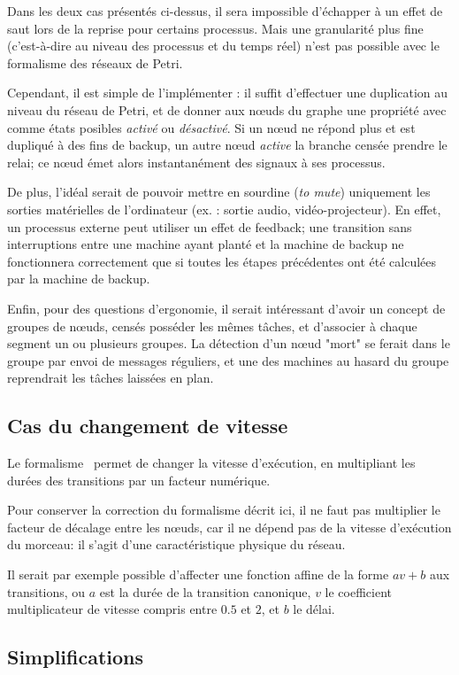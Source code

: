 Dans les deux cas présentés ci-dessus, il sera impossible d'échapper à un effet de saut lors de la reprise pour certains processus. Mais une granularité plus fine (c'est-à-dire au niveau des processus et du temps réel) n'est pas possible avec le formalisme des réseaux de Petri.

Cependant, il est simple de l'implémenter : il suffit d'effectuer une duplication au niveau du réseau de Petri, et de donner aux nœuds du graphe une propriété avec comme états posibles \textit{activé} ou \textit{désactivé}. Si un nœud ne répond plus et est dupliqué à des fins de backup, un autre nœud \textit{active} la branche censée prendre le relai; ce nœud émet alors instantanément des signaux à ses processus.

De plus, l'idéal serait de pouvoir mettre en sourdine (\textit{to mute}) uniquement les sorties matérielles de l'ordinateur (ex. : sortie audio, vidéo-projecteur). En effet, un processus externe peut utiliser un effet de feedback; une transition sans interruptions entre une machine ayant planté et la machine de backup ne fonctionnera correctement que si toutes les étapes précédentes ont été calculées par la machine de backup.

Enfin, pour des questions d'ergonomie, il serait intéressant d'avoir un concept de groupes de nœuds, censés posséder les mêmes tâches, et d'associer à chaque segment un ou plusieurs groupes. La détection d'un nœud "mort" se ferait dans le groupe par envoi de messages réguliers, et une des machines au hasard du groupe reprendrait les tâches laissées en plan.

\subsection{Cas du changement de vitesse}
Le formalisme~\cite{allombert2010virage} permet de changer la vitesse d'exécution, en multipliant les durées des transitions par un facteur numérique.

Pour conserver la correction du formalisme décrit ici, il ne faut pas multiplier le facteur de décalage entre les nœuds, car il ne dépend pas de la vitesse d'exécution du morceau: il s'agit d'une caractéristique physique du réseau.

Il serait par exemple possible d'affecter une fonction affine de la forme $av + b$ aux transitions, ou $a$ est la durée de la transition canonique, $v$ le coefficient multiplicateur de vitesse compris entre $0.5$ et $2$, et $b$ le délai. 

\subsection{Simplifications}
